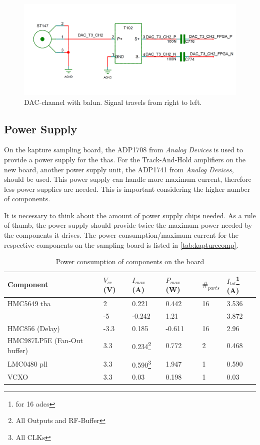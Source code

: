 \begin{figure}[tbh]
	\centering
	\includegraphics[width = \textwidth]{chap/04-work/img/dac_channel}
	\caption{DAC-channel with balun. Signal travels from right to left.}
	\label{fig:dac_channel}
\end{figure}


\subsection{Power Supply}
On the \gls{kapture} sampling board, the ADP1708 from \textit{Analog Devices} is used to provide a power supply for the \glspl{tha}. 
For the Track-And-Hold amplifiers on the new board, another power supply unit, the ADP1741 from \textit{Analog Devices}, should be used. This power supply can handle more maximum current, therefore less power supplies are needed. This is important considering the higher number of components. 

It is necessary to think about the amount of power supply chips needed. As a rule of thumb, the power supply should provide twice the maximum power needed by the components it drives. \cite{michele} The power consumption/maximum current for the respective components on the sampling board is listed in \autoref{tab:kapturecomp}. 
\begin{table}[tbh]
	\caption{Power consumption of components on the board}
	\label{tab:kapturecomp}
	\begin{minipage}{\textwidth}
		\centering
		\begin{tabularx}{\textwidth}{Xlllll}
			\toprule
			\textbf{Component} & $V_{cc}$ (V) & $I_{max}$ (A) & $P_{max}$ (W) & $\#_{parts}$ &  $I_{tot}$\footnote{for 16 \glspl{adc}} (A)  \\
			\midrule
			HMC5649 \gls{tha} 	& 2	  	& 0.221 	 & 0.442 & 16 & 3.536\\
			& -5  	& -0.242 & 1.21 &  & 3.872\\
			HMC856 (Delay) 			& -3.3	& 0.185 & -0.611 & 16 & 2.96\\
			HMC987LP5E (Fan-Out buffer) 	& 3.3 	& 0.234\footnote{All Outputs and RF-Buffer} & 0.772 & 2 & 0.468\\
			LMC0480 \gls{pll}			& 3.3 	& 0.590\footnote{All CLKs} & 1.947 & 1 & 0.590\\
			VCXO 					& 3.3 	& 0.03 & 0.198 & 1 & 0.03\\
			
			\bottomrule
	\end{tabularx}
	\end{minipage}
\end{table}

